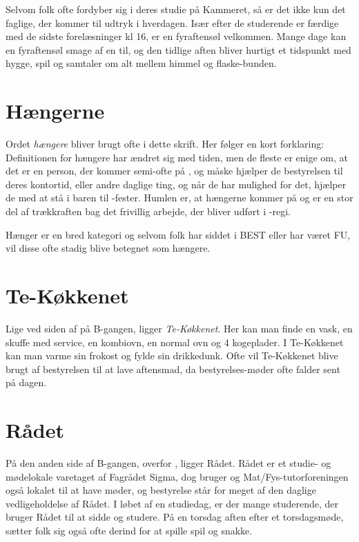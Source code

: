 Selvom folk ofte fordyber sig i deres studie på Kammeret, så er det ikke kun det faglige, der kommer til udtryk i hverdagen. Især efter de studerende er færdige med de sidste forelæsninger kl 16, er en fyraftensøl velkommen. Mange dage kan en fyraftensøl smage af en til, og den tidlige aften bliver hurtigt et tidspunkt med hygge, spil og samtaler om alt mellem himmel og flaske-bunden.

\newpage


\section{Hængerne}
Ordet \textit{hængere} bliver brugt ofte i dette skrift. Her følger en kort forklaring: Definitionen for hængere har ændret sig med tiden, men de fleste er enige om, at det er en person, der kommer semi-ofte på \TKET{}, og måske hjælper de bestyrelsen til deres kontortid, eller andre daglige ting, og når de har mulighed for det, hjælper de med at stå i baren til \TK{}-fester. Humlen er, at hængerne kommer på \TKET og er en stor del af trækkraften bag det frivillig arbejde, der bliver udført i \TK-regi.

Hænger er en bred kategori og selvom folk har siddet i BEST eller har været FU, vil disse ofte stadig blive betegnet som hængere.

\section{Te-Køkkenet}
Lige ved siden af \TKET på B-gangen, ligger \textit{Te-Køkkenet}. Her kan man finde en vask, en skuffe med service, en kombiovn, en normal ovn og 4 kogeplader. I Te-Køkkenet kan man varme sin frokost og fylde sin drikkedunk. Ofte vil Te-Køkkenet blive brugt af bestyrelsen til at lave aftensmad, da bestyrelses-møder ofte falder sent på dagen.

\section{Rådet}
På den anden side af B-gangen, overfor \TKET, ligger Rådet. Rådet er et studie- og mødelokale varetaget af Fagrådet Sigma, dog bruger \TKET og Mat/Fys-tutorforeningen også lokalet til at have møder, og \TKETs bestyrelse står for meget af den daglige vedligeholdelse af Rådet. I løbet af en studiedag, er der mange studerende, der bruger Rådet til at sidde og studere. På en torsdag aften efter et torsdagsmøde, sætter folk sig også ofte derind for at spille spil og snakke.

